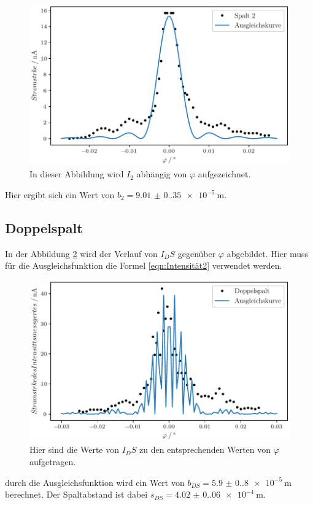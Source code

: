 \begin{figure}[H]
  \centering
  \includegraphics{plot1.pdf}
  \caption{In dieser Abbildung wird $I_2$ abhängig von $\varphi$ aufgezeichnet.}
  \label{fig:Spalt2}
\end{figure}

Hier ergibt sich ein Wert von $b_2=\qty{9.01(0.35)e-5}{\meter}$.

\subsection{Doppelspalt}

In der Abbildung \ref{fig:Doppelspalt} wird der Verlauf von $I_DS$ gegenüber $\varphi$ abgebildet.
Hier muss für die Ausgleichsfunktion die Formel \ref{eqn:Intensität2} verwendet werden.

\begin{figure}[H]
  \centering
  \includegraphics{plot2.pdf}
  \caption{Hier sind die Werte von $I_DS$ zu den entsprechenden Werten von $\varphi$ aufgetragen.}
  \label{fig:Doppelspalt}
\end{figure}

\noindent durch die Ausgleichsfunktion wird ein Wert von $b_{DS}=\qty{5.9(0.8)e-5}{\meter}$ berechnet.
Der Spaltabstand ist dabei $s_{DS}=\qty{4.02(0.06)e-4}{\meter}$.
